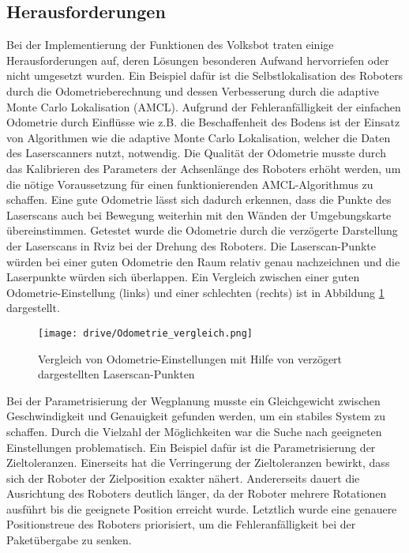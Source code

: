 \subsection{Herausforderungen}

Bei der Implementierung der Funktionen des Volksbot traten einige Herausforderungen auf, deren Lösungen besonderen Aufwand hervorriefen oder nicht umgesetzt wurden. Ein Beispiel dafür ist die Selbstlokalisation des Roboters durch die Odometrieberechnung und dessen Verbesserung durch die adaptive Monte Carlo Lokalisation (AMCL). Aufgrund der Fehleranfälligkeit der einfachen Odometrie durch Einflüsse wie z.B. die Beschaffenheit des Bodens ist der Einsatz von Algorithmen wie die adaptive Monte Carlo Lokalisation, welcher die Daten des Laserscanners nutzt, notwendig.  Die Qualität der Odometrie musste durch das Kalibrieren des Parameters der Achsenlänge des Roboters erhöht werden, um die nötige Voraussetzung für einen funktionierenden AMCL-Algorithmus zu schaffen. Eine gute Odometrie lässt sich dadurch erkennen, dass die Punkte des Laserscans auch bei Bewegung weiterhin mit den Wänden der Umgebungskarte übereinstimmen. Getestet wurde die Odometrie durch die verzögerte Darstellung der Laserscans in Rviz bei der Drehung des Roboters. Die Laserscan-Punkte würden bei einer guten Odometrie den Raum relativ genau nachzeichnen und die Laserpunkte würden sich überlappen. Ein Vergleich zwischen einer guten Odometrie-Einstellung (links) und einer schlechten (rechts) ist in Abbildung \ref{fig:Odo_vergleich} dargestellt.

\begin{figure}[h!]
 \centering
		\texttt{[image: drive/Odometrie\_vergleich.png]}
	\caption{Vergleich von Odometrie-Einstellungen mit Hilfe von verzögert dargestellten Laserscan-Punkten}
	\label{fig:Odo_vergleich}
\end{figure}

Bei der Parametrisierung der Wegplanung musste ein Gleichgewicht zwischen Geschwindigkeit und Genauigkeit gefunden werden, um ein stabiles System zu schaffen. Durch die Vielzahl der Möglichkeiten war die Suche nach geeigneten Einstellungen problematisch. Ein Beispiel dafür ist die Parametrisierung der Zieltoleranzen. Einerseits hat die Verringerung der Zieltoleranzen bewirkt, dass sich der Roboter der Zielposition exakter nähert. Andererseits dauert die Ausrichtung des Roboters deutlich länger, da der Roboter mehrere Rotationen ausführt bis die geeignete Position erreicht wurde. Letztlich wurde eine genauere Positionstreue des Roboters priorisiert, um die Fehleranfälligkeit bei der Paketübergabe zu senken.


